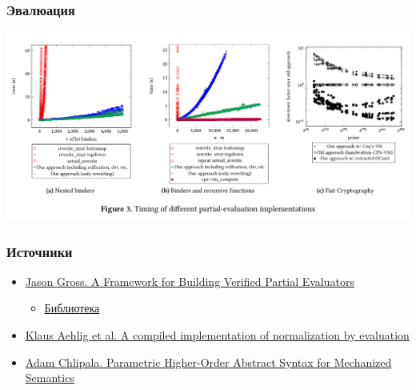 \documentclass[xcolor=table]{beamer}
\begin{document}
\begin{frame}[fragile]
  \transwipe[direction=90]
  \frametitle{Эвалюация}

\includegraphics[width=\textwidth]{pictures/evaluation.png}
\end{frame}

\begin{frame}[fragile]
  \transwipe[direction=90]
  \frametitle{Источники}

  \begin{itemize}
    \item \href{https://people.csail.mit.edu/jgross/personal-website/papers/2020-rewriting-pldi-draft.pdf}{Jason Gross. A Framework for Building Verified Partial Evaluators}
    \begin{itemize}
      \item \href{https://github.com/mit-plv/rewriter}{Библиотека}
    \end{itemize}
    \item \href{https://citeseerx.ist.psu.edu/viewdoc/summary?doi=10.1.1.561.7972}{Klaus Aehlig et al. A compiled implementation of normalization by evaluation}
    \item \href{http://adam.chlipala.net/papers/PhoasICFP08/PhoasICFP08.pdf}{Adam Chlipala. Parametric Higher-Order Abstract Syntax for Mechanized Semantics}
  \end{itemize}

\end{frame}
\end{document}
